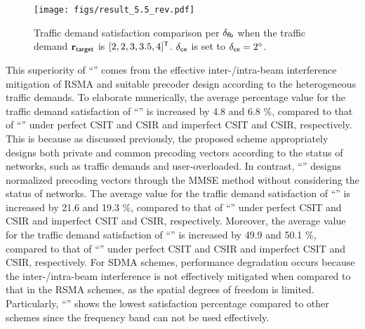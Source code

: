 \documentclass[draftclsnofoot, onecolumn, comsoc, 12pt]{IEEEtran}
\begin{document}
\begin{figure}[!t]
\centering
 		\texttt{[image: figs/result\_5.5\_rev.pdf]}%
 		\caption{{Traffic demand satisfaction comparison per $\delta_{\sf{fb}}$ when the traffic demand $\mathbf{r}_{\sf{target}}$ is $[2, 2, 3, 3.5, 4]^{\sf{T}}$. $\delta_{\sf{ce}}$ is set to  $\delta_{\sf{ce}}=2^{\circ}$.}}
    	\label{result_6} %
\end{figure}


This superiority of ``{}'' comes from the effective inter-/intra-beam interference mitigation of RSMA and suitable precoder design according to the heterogeneous traffic demands.
{To elaborate numerically, the average percentage value for the traffic demand satisfaction of ``{}'' is increased by 4.8 and 6.8 $\%$, compared to that of ``{}'' under perfect CSIT and CSIR and imperfect CSIT and CSIR, respectively.}
This is because as discussed previously, the proposed scheme appropriately designs both private and common precoding vectors according to the status of networks, such as traffic demands and user-overloaded. 
In contrast, ``{}'' designs normalized precoding vectors through the MMSE method without considering the status of networks. 
{The average value for the traffic demand satisfaction of ``{}'' is increased by 21.6 and 19.3 $\%$, compared to that of ``{}'' under perfect CSIT and CSIR and imperfect CSIT and CSIR, respectively.}
{Moreover, the average value for the traffic demand satisfaction of ``{}'' is increased by 49.9 and 50.1 $\%$, compared to that of ``{}'' under perfect CSIT and CSIR and imperfect CSIT and CSIR, respectively.}
For SDMA schemes, performance degradation occurs because the inter-/intra-beam interference is not effectively mitigated when compared to that in the RSMA schemes, as the {spatial degrees of freedom} is limited. 
Particularly, ``{}'' shows the lowest satisfaction percentage compared to other schemes since the frequency band can not be used effectively.
\end{document}

